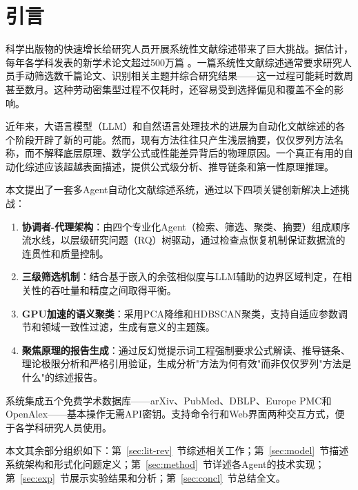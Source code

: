 \section{引言}
\label{sec:intro}

科学出版物的快速增长给研究人员开展系统性文献综述带来了巨大挑战。据估计，每年各学科发表的新学术论文超过500万篇 \citep{bornmann-etal-2021}。一篇系统性文献综述通常要求研究人员手动筛选数千篇论文、识别相关主题并综合研究结果——这一过程可能耗时数周甚至数月。这种劳动密集型过程不仅耗时，还容易受到选择偏见和覆盖不全的影响。

近年来，大语言模型（LLM）和自然语言处理技术的进展为自动化文献综述的各个阶段开辟了新的可能。然而，现有方法往往只产生浅层摘要，仅仅罗列方法名称，而不解释底层原理、数学公式或性能差异背后的物理原因。一个真正有用的自动化综述应该超越表面描述，提供公式级分析、推导链条和第一性原理推理。

本文提出了一套多Agent自动化文献综述系统，通过以下四项关键创新解决上述挑战：

\begin{enumerate}
    \item \textbf{协调者-代理架构}：由四个专业化Agent（检索、筛选、聚类、摘要）组成顺序流水线，以层级研究问题（RQ）树驱动，通过检查点恢复机制保证数据流的连贯性和质量控制。
    \item \textbf{三级筛选机制}：结合基于嵌入的余弦相似度与LLM辅助的边界区域判定，在相关性的吞吐量和精度之间取得平衡。
    \item \textbf{GPU加速的语义聚类}：采用PCA降维和HDBSCAN聚类，支持自适应参数调节和领域一致性过滤，生成有意义的主题簇。
    \item \textbf{聚焦原理的报告生成}：通过反幻觉提示词工程强制要求公式解读、推导链条、理论极限分析和严格引用验证，生成分析"方法为何有效"而非仅仅罗列"方法是什么"的综述报告。
\end{enumerate}

系统集成五个免费学术数据库——arXiv、PubMed、DBLP、Europe PMC和OpenAlex——基本操作无需API密钥。支持命令行和Web界面两种交互方式，便于各学科研究人员使用。

本文其余部分组织如下：第~\ref{sec:lit-rev}~节综述相关工作；第~\ref{sec:model}~节描述系统架构和形式化问题定义；第~\ref{sec:method}~节详述各Agent的技术实现；第~\ref{sec:exp}~节展示实验结果和分析；第~\ref{sec:concl}~节总结全文。
